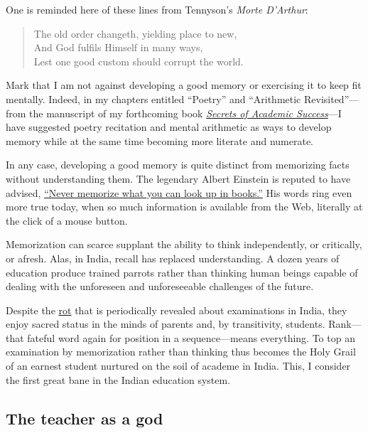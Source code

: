 \documentclass[
  12pt,
  british,
  a4paper,
  rgb,
  dvipsnames,
  svgnames,
  hyphens]{article}
\begin{document}
One is reminded here of these lines from Tennyson's \emph{Morte
D'Arthur}:

\begin{quote}
The old order changeth, yielding place to new,\\
And God fulfils Himself in many ways,\\
Lest one good custom should corrupt the world.
\end{quote}

Mark that I am not against developing a good memory or exercising it to
keep fit mentally. Indeed, in my chapters entitled ``Poetry'' and
``Arithmetic Revisited''---from the manuscript of my forthcoming book
\href{\%7Bstatic\%7D/sas-manuscript/SAS-partial.pdf}{\emph{Secrets of
Academic Success}}---I have suggested poetry recitation and mental
arithmetic as ways to develop memory while at the same time becoming
more literate and numerate.

In any case, developing a good memory is quite distinct from memorizing
facts without understanding them. The legendary Albert Einstein is
reputed to have advised,
\href{http://en.wikiquote.org/wiki/Albert_Einstein}{``Never memorize
what you can look up in books.''} His words ring even more true today,
when so much information is available from the Web, literally at the
click of a mouse button.

Memorization can scarce supplant the ability to think independently, or
critically, or afresh. Alas, in India, recall has replaced
understanding. A dozen years of education produce trained parrots rather
than thinking human beings capable of dealing with the unforeseen and
unforeseeable challenges of the future.

Despite the
\href{http://deedy.quora.com/Hacking-into-the-Indian-Education-System}{rot}
that is periodically revealed about examinations in India, they enjoy
sacred status in the minds of parents and, by transitivity, students.
Rank---that fateful word again for position in a sequence---means
everything. To top an examination by memorization rather than thinking
thus becomes the Holy Grail of an earnest student nurtured on the soil
of academe in India. This, I consider the first great bane in the Indian
education system.

\hypertarget{the-teacher-as-a-god}{%
\subsection{The teacher as a god}\label{the-teacher-as-a-god}}
\end{document}
